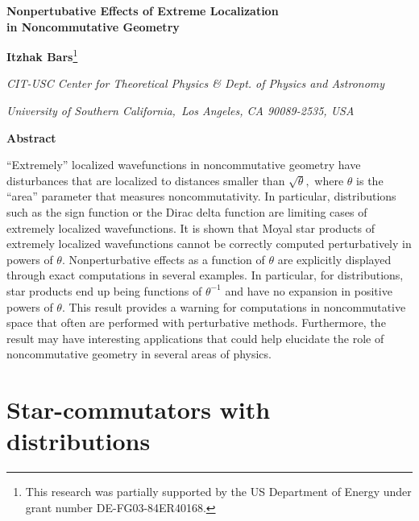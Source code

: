 \documentclass[a4paper,12pt]{article}
\begin{document}

{\vskip1.5cm}

\begin{center}
{\Large \textbf{Nonpertubative Effects of Extreme Localization\\[0pt]
in Noncommutative Geometry}}

\bigskip

{\vskip1.0cm}

\textbf{Itzhak Bars}{\footnote{%
This research was partially supported by the US Department of Energy under
grant number DE-FG03-84ER40168.}}

{\vskip1.0cm}

\textsl{CIT-USC Center for Theoretical Physics \& Dept. of Physics and
Astronomy}

\textsl{University of Southern California,\ Los Angeles, CA 90089-2535, USA}

{\vskip1.5cm}

\textbf{Abstract}
\end{center}

{\vskip1.0cm}

``Extremely'' localized wavefunctions in noncommutative geometry have
disturbances that are localized to distances smaller than $\sqrt{\theta },$
where $\theta $ is the ``area'' parameter that measures noncommutativity. In
particular, distributions such as the sign function or the Dirac delta
function are limiting cases of extremely localized wavefunctions. It is
shown that Moyal star products of extremely localized wavefunctions cannot
be correctly computed perturbatively in powers of $\theta $. Nonperturbative
effects as a function of $\theta $ are explicitly displayed through exact
computations in several examples. In particular, for distributions, star
products end up being functions of $\theta ^{-1}$ and have no expansion in
positive powers of $\theta .$ This result provides a warning for
computations in noncommutative space that often are performed with
perturbative methods. Furthermore, the result may have interesting
applications that could help elucidate the role of noncommutative geometry
in several areas of physics.

\newpage

\section{Star-commutators with distributions}
\end{document}
